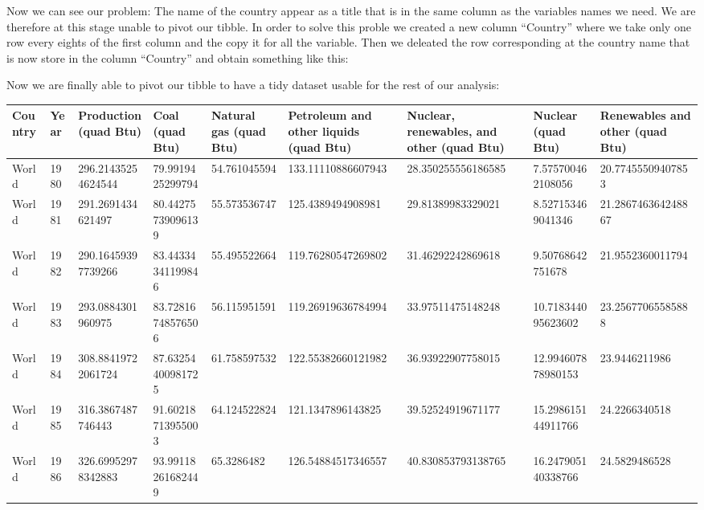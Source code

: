 \documentclass[
]{article}
\begin{document}
Now we can see our problem: The name of the country appear as a title
that is in the same column as the variables names we need. We are
therefore at this stage unable to pivot our tibble. In order to solve
this proble we created a new column ``Country'' where we take only one
row every eights of the first column and the copy it for all the
variable. Then we deleated the row corresponding at the country name
that is now store in the column ``Country'' and obtain something like
this:

Now we are finally able to pivot our tibble to have a tidy dataset
usable for the rest of our analysis:

\begin{tabu} to 
\hline
Country & Year &     Production (quad Btu) &         Coal (quad Btu) &         Natural gas (quad Btu) &         Petroleum and other liquids (quad Btu) &         Nuclear, renewables, and other (quad Btu) &             Nuclear (quad Btu) &             Renewables and other (quad Btu)\\
\hline
World & 1980 & 296.21435254624544 & 79.9919425299794 & 54.761045594 & 133.11110886607943 & 28.350255556186585 & 7.575700462108056 & 20.77455509407853\\
\hline
World & 1981 & 291.2691434621497 & 80.44275739096139 & 55.573536747 & 125.4389494908981 & 29.81389983329021 & 8.527153469041346 & 21.286746364248867\\
\hline
World & 1982 & 290.16459397739266 & 83.44334341199846 & 55.495522664 & 119.76280547269802 & 31.46292242869618 & 9.50768642751678 & 21.9552360011794\\
\hline
World & 1983 & 293.0884301960975 & 83.72816748576506 & 56.115951591 & 119.26919636784994 & 33.97511475148248 & 10.718344095623602 & 23.25677065585888\\
\hline
World & 1984 & 308.88419722061724 & 87.63254400981725 & 61.758597532 & 122.55382660121982 & 36.93922907758015 & 12.994607878980153 & 23.9446211986\\
\hline
World & 1985 & 316.3867487746443 & 91.60218713955003 & 64.124522824 & 121.1347896143825 & 39.52524919671177 & 15.298615144911766 & 24.2266340518\\
\hline
World & 1986 & 326.69952978342883 & 93.99118261682449 & 65.3286482 & 126.54884517346557 & 40.830853793138765 & 16.247905140338766 & 24.5829486528\\
\hline
\end{tabu}
\end{document}
